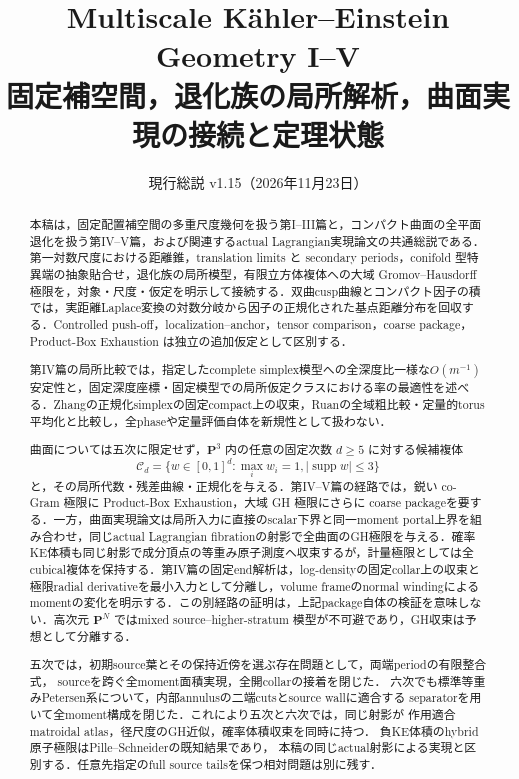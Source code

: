 \documentclass[a4paper,11pt]{ltjsarticle}
\title{\bfseries Multiscale K\"ahler--Einstein Geometry I--V\\[2mm]
\Large 固定補空間，退化族の局所解析，曲面実現の接続と定理状態}
\author{}
\date{現行総説 v1.15（2026年11月23日）}
\numberwithin{equation}{section}
\theoremstyle{plain}
\theoremstyle{definition}
\theoremstyle{remark}
\newcommand{\PP}{\mathbf P}
\newcommand{\cC}{\mathcal C}
\newcommand{\supp}{\operatorname{supp}}
\begin{document}
\maketitle

\begin{abstract}
本稿は，固定配置補空間の多重尺度幾何を扱う第I--III篇と，コンパクト曲面の全平面退化を扱う第IV--V篇，および関連するactual Lagrangian実現論文の共通総説である．第一対数尺度における距離錐，translation limits と secondary periods，conifold 型特異端の抽象貼合せ，退化族の局所模型，有限立方体複体への大域 Gromov--Hausdorff 極限を，対象・尺度・仮定を明示して接続する．双曲cusp曲線とコンパクト因子の積では，実距離Laplace変換の対数分岐から因子の正規化された基点距離分布を回収する．Controlled push-off，localization--anchor，tensor comparison，coarse package，Product-Box Exhaustion は独立の追加仮定として区別する．

第IV篇の局所比較では，指定したcomplete simplex模型への全深度比一様な$O(m^{-1})$安定性と，固定深度座標・固定模型での局所仮定クラスにおける率の最適性を述べる．Zhangの正規化simplexの固定compact上の収束，Ruanの全域粗比較・定量的torus平均化と比較し，全phaseや定量評価自体を新規性として扱わない．

曲面については五次に限定せず，\(\PP^3\) 内の任意の固定次数 \(d\ge5\) に対する候補複体
\[
 \cC_d=\{w\in[0,1]^d:\max_iw_i=1,
                 |\supp w|\le3\}
\]
と，その局所代数・残差曲線・正規化を与える．第IV--V篇の経路では，鋭い co-Gram 極限に Product-Box Exhaustion，大域 GH 極限にさらに coarse packageを要する．一方，曲面実現論文は局所入力に直接のscalar下界と同一moment portal上界を組み合わせ，同じactual Lagrangian fibrationの射影で全曲面のGH極限を与える．確率KE体積も同じ射影で成分頂点の等重み原子測度へ収束するが，計量極限としては全cubical複体を保持する．第IV篇の固定end解析は，log-densityの固定collar上の収束と極限radial derivativeを最小入力として分離し，volume frameのnormal windingによるmomentの変化を明示する．この別経路の証明は，上記package自体の検証を意味しない．高次元 \(\PP^N\) ではmixed source--higher-stratum 模型が不可避であり，GH収束は予想として分離する．

五次では，初期source葉とその保持近傍を選ぶ存在問題として，両端periodの有限整合式，
sourceを跨ぐ全moment面積実現，全開collarの接着を閉じた．
六次でも標準等重みPetersen系について，内部annulusの二端cutsとsource wallに適合する
separatorを用いて全moment構成を閉じた．これにより五次と六次では，同じ射影が
作用適合matroidal atlas，径尺度のGH近似，確率体積収束を同時に持つ．
負KE体積のhybrid原子極限はPille--Schneiderの既知結果であり，
本稿の同じactual射影による実現と区別する．任意先指定のfull source tailsを保つ相対問題は別に残す．
\end{abstract}
\end{document}

